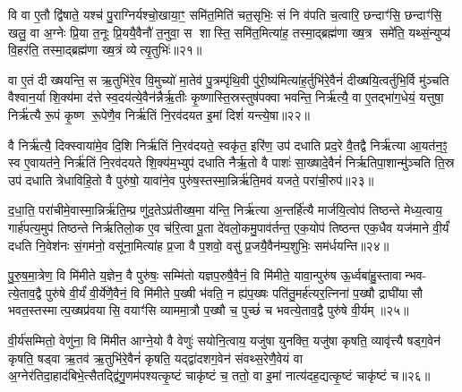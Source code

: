 {\anuvakamend[{अ॒द्ध्य॒व॒सा॒यय॑ति॒ ह्ये॑तद्वि॒श्वामि॑त्रस्यादधत॒ द्वे लो॒कस्य॑ लो॒केषु॑ स॒प्तच॑त्वारिशच्च॥३॥}]}

वि वा ए॒तौ द्वि॑षाते॒ यश्च॑ पु॒राग्निर्यश्चो॒खाया॒ꣳ॒ समि॑त॒मिति॑ चत॒सृभिः॒ सं नि व॑पति च॒त्वारि॒ छन्दाꣳ॑सि॒ छन्दाꣳ॑सि॒ खलु॒ वा अ॒ग्नेः प्रि॒या त॒नूः प्रि॒ययै॒वैनौ॑ त॒नुवा॒ स शास्ति॒ समि॑त॒मित्या॑ह॒ तस्मा॒द्ब्रह्म॑णा ख्ष॒त्र समे॑ति॒ यथ्सं॒न्युप्य॑ वि॒हर॑ति॒ तस्मा॒द्ब्रह्म॑णा ख्ष॒त्रं व्येत्यृ॒तुभिः॑॥२१॥

वा ए॒तं दीख्षयन्ति॒ स ऋ॒तुभि॑रे॒व वि॒मुच्यो॑ मा॒तेव॑ पु॒त्रम्पृ॑थि॒वी पु॑री॒ष्य॑मित्या॑ह॒र्तुभि॑रे॒वैनं॑ दीख्षयि॒त्वर्तुभि॒र्वि मु॑ञ्चति वैश्वान॒र्या शि॒क्य॑मा द॑त्ते स्व॒दय॑त्ये॒वैन॑न्नैर्\mbox{}ऋ॒तीः कृ॒ष्णास्ति॒स्रस्तुष॑पक्वा भवन्ति॒ निर्\mbox{}ऋ॑त्यै॒ वा ए॒तद्भा॑ग॒धेयं॒ यत्तुषा॒ निर्\mbox{}ऋ॑त्यै रू॒पं कृ॒ष्ण रू॒पेणै॒व निर्\mbox{}ऋ॑तिं नि॒रव॑दयत इ॒मां दिशं॑ यन्त्ये॒षा॥२२॥

वै निर्\mbox{}ऋ॑त्यै॒ दिक्स्वाया॑मे॒व दि॒शि निर्\mbox{}ऋ॑तिं नि॒रव॑दयते॒ स्वकृ॑त॒ इरि॑ण॒ उप॑ दधाति प्रद॒रे वै॒तद्वै निर्\mbox{}ऋ॑त्या आ॒यत॑न॒ꣵ॒ स्व ए॒वायत॑ने॒ निर्\mbox{}ऋ॑तिं नि॒रव॑दयते शि॒क्य॑म॒भ्युप॑ दधाति नैर्\mbox{}ऋ॒तो वै पाशः॑ सा॒ख्षादे॒वैनं॑ निर्\mbox{}ऋतिपा॒शान्मु॑ञ्चति ति॒स्र उप॑ दधाति त्रेधाविहि॒तो वै पुरु॑षो॒ यावा॑ने॒व पुरु॑ष॒स्तस्मा॒न्निर्\mbox{}ऋ॑ति॒मव॑ यजते॒ परा॑ची॒रुप॑॥२३॥

द॒धा॒ति॒ परा॑चीमे॒वास्मा॒न्निर्\mbox{}ऋ॑ति॒म्प्र णु॑द॒तेऽप्र॑तीख्ष॒मा य॑न्ति॒ निर्\mbox{}ऋ॑त्या अ॒न्तर्\mbox{}हि॑त्यै मार्जयि॒त्वोप॑ तिष्ठन्ते मेध्य॒त्वाय॒ गार्\mbox{}ह॑पत्य॒मुप॑ तिष्ठन्ते निर्\mbox{}ऋतिलो॒क ए॒व च॑रि॒त्वा पू॒ता दे॑वलो॒कमु॒पाव॑र्तन्त॒ एक॒योप॑ तिष्ठन्त एक॒धैव यज॑माने वी॒र्यं॑ दधति नि॒वेश॑नः सं॒गम॑नो॒ वसू॑ना॒मित्या॑ह प्र॒जा वै प॒शवो॒ वसु॑ प्र॒जयै॒वैन॑म्प॒शुभिः॒ सम॑र्धयन्ति॥२४॥

{\anuvakamend[{ऋ॒तुभि॑रे॒षा परा॑ची॒रुपा॒ष्टाच॑त्वारिशच्च॥४॥}]}

पु॒रु॒ष॒मा॒त्रेण॒ वि मि॑मीते य॒ज्ञेन॒ वै पुरु॑षः॒ सम्मि॑तो यज्ञप॒रुषै॒वैनं॒ वि मि॑मीते॒ यावा॒न्पुरु॑ष ऊ॒र्ध्वबा॑हु॒स्तावान्भव- त्ये॒ताव॒द्वै पुरु॑षे वी॒र्यं॑ वी॒र्ये॑णै॒वैनं॒ वि मि॑मीते प॒ख्षी भ॑वति॒ न ह्य॑प॒ख्षः पति॑तु॒मर्\mbox{}ह॑त्यर॒त्निना॑ प॒ख्षौ द्राघी॑यासौ भवत॒स्तस्मात्प॒ख्षप्र॑वयासि॒ वयाꣳ॑सि व्याममा॒त्रौ प॒ख्षौ च॒ पुच्छं॑ च भवत्ये॒ताव॒द्वै पुरु॑षे वी॒र्यम्॥२५॥

वी॒र्य॑सम्मितो॒ वेणु॑ना॒ वि मि॑मीत आग्ने॒यो वै वेणुः॑ सयोनि॒त्वाय॒ यजु॑षा युनक्ति॒ यजु॑षा कृषति॒ व्यावृ॑त्त्यै षड्ग॒वेन॑ कृषति॒ षड्वा ऋ॒तव॑ ऋ॒तुभि॑रे॒वैनं॑ कृषति॒ यद्द्वा॑दशग॒वेन॑ संवथ्स॒रेणै॒वेयं वा अ॒ग्नेर॑तिदा॒हाद॑बिभे॒त्सैतद्द्वि॑गु॒णम॑पश्यत्कृ॒ष्टं चाकृ॑ष्टं च॒ ततो॒ वा इ॒मां नात्य॑दह॒द्यत्कृ॒ष्टं चाकृ॑ष्टं च॥२६॥

